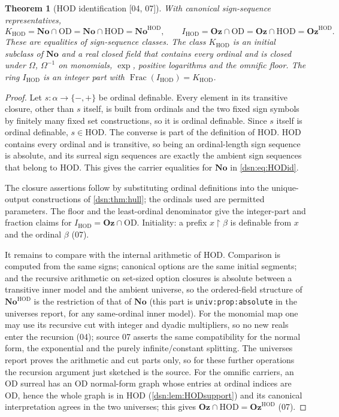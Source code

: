 \documentclass[11pt,a4paper]{article}
\numberwithin{equation}{section}
\newtheorem{theorem}{Theorem}[section]
\theoremstyle{definition}
\theoremstyle{remark}
\newcommand{\No}{\mathbf{No}}
\newcommand{\Oz}{\mathbf{Oz}}
\newcommand{\OD}{\mathrm{OD}}
\newcommand{\HOD}{\mathrm{HOD}}
\newcommand{\Frac}{\operatorname{Frac}}
\newcommand{\KH}{K_{\HOD}}
\newcommand{\IH}{I_{\HOD}}
\newcommand{\res}{\mathbin{\upharpoonright}}
\newcommand{\src}[1]{\textup{\textsf{\small[#1]}}}
\newcommand{\lbl}[1]{\nolinkurl{#1}}
\begin{document}
\begin{theorem}[HOD identification \src{04, 07}]\label{dsn:thm:HOD}
With canonical sign-sequence representatives,
\begin{equation}\label{dsn:eq:HODid}
 \KH=\No\cap\OD=\No\cap\HOD=\No^{\HOD},
 \qquad
 \IH=\Oz\cap\OD=\Oz\cap\HOD=\Oz^{\HOD}.
\end{equation}
These are equalities of sign-sequence classes. The class $\KH$ is an
initial subclass of $\No$ and a real closed field that contains every
ordinal and is closed under $\Omega$, $\Omega^{-1}$ on monomials, $\exp$,
positive logarithms and the omnific floor. The ring $\IH$ is an integer
part with $\Frac(\IH)=\KH$.
\end{theorem}
\begin{proof}
Let $s:\alpha\to\{-,+\}$ be ordinal definable. Every element in its
transitive closure, other than $s$ itself, is built from ordinals and the
two fixed sign symbols by finitely many fixed set constructions, so it is
ordinal definable. Since $s$ itself is ordinal definable, $s\in\HOD$.
The converse is part of the definition of $\HOD$. $\HOD$ contains every
ordinal and is transitive, so being an ordinal-length sign sequence is
absolute, and its surreal sign sequences are exactly the ambient sign
sequences that belong to $\HOD$. This gives the carrier equalities for
$\No$ in \eqref{dsn:eq:HODid}.

The closure assertions follow by substituting ordinal definitions into the
unique-output constructions of \cref{dsn:thm:hull}; the ordinals used are
permitted parameters. The floor and the least-ordinal denominator give the
integer-part and fraction claims for $\IH=\Oz\cap\OD$. Initiality: a prefix
$x\res\beta$ is definable from $x$ and the ordinal $\beta$ (07).

It remains to compare with the internal arithmetic of $\HOD$. Comparison is
computed from the same signs; canonical options are the same initial
segments; and the recursive arithmetic on set-sized option closures is
absolute between a transitive inner model and the ambient universe, so the
ordered-field structure of $\No^{\HOD}$ is the restriction of that of $\No$
(this part is \lbl{univ:prop:absolute} in the universes report, for any
same-ordinal inner model). For the monomial map one may use its recursive
cut with integer and dyadic multipliers, so no new reals enter the
recursion (04); source 07 asserts the same compatibility for the normal
form, the exponential and the purely infinite/constant splitting. The
universes report proves the arithmetic and cut parts only, so for these
further operations the recursion argument just sketched is the source.
For the omnific carriers, an $\OD$ surreal has an $\OD$ normal-form graph
whose entries at ordinal indices are $\OD$, hence the whole graph is in
$\HOD$ (\cref{dsn:lem:HODsupport}) and its canonical interpretation agrees
in the two universes; this gives $\Oz\cap\HOD=\Oz^{\HOD}$ (07).
\end{proof}
\end{document}
